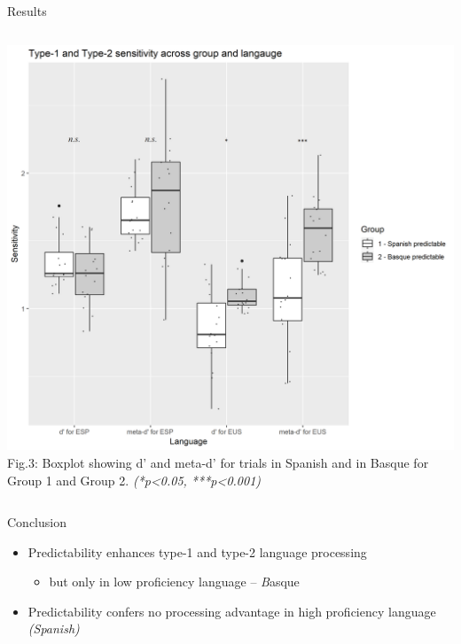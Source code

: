 \documentclass[final,12pt]{beamer}
\begin{document}
\begin{frame}[t]
\begin{columns}[t]
\begin{column}{\halfpagecol}
\begin{block}{Results}
\begin{columns}
        \begin{column}{0.57\linewidth}
          \includegraphics[width=\linewidth]{images/dmetad}
         \hfill
         \centering
          \scriptsize{\tiny{
Fig.3: Boxplot showing d' and meta-d' for trials in Spanish and in Basque for Group 1 and Group 2.
 \textit{(*p\textless0.05, ***p\textless0.001)}
 }}
        \end{column}
      \end{columns}
  
  \end{block}
  
    \vspace{-.1em}

    \begin{block}{Conclusion}
    \begin{itemize}
     \item \small Predictability enhances type-1 and type-2 language processing
     \begin{itemize}
         \item but only in low proficiency language -- \textit Basque
        \end{itemize}
    \item \small Predictability confers no processing advantage in high proficiency language \emph{(Spanish)}
 \end{itemize}
 

\end{block}
\end{column}
\end{columns}
\end{frame}
\end{document}
